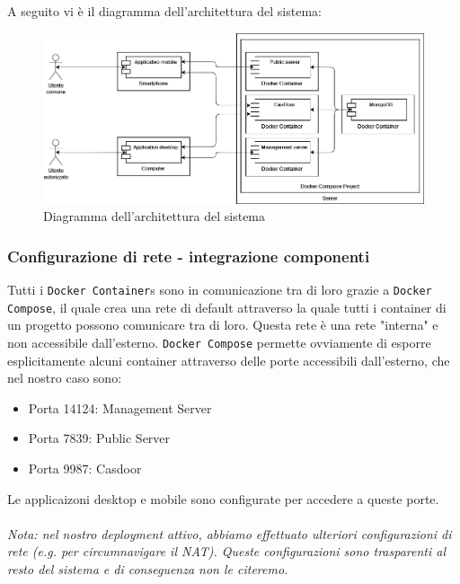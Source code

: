 \documentclass{article}
\begin{document}
A seguito vi è il diagramma dell'architettura del sistema:

\begin{figure}[H]
    \centering
    \includegraphics[width=1\textwidth]{Images/Component.png}
    \caption{Diagramma dell'architettura del sistema}
    \label{fig:architettura}
\end{figure}

\subsubsection{Configurazione di rete - integrazione componenti}
Tutti i \texttt{Docker Container}s sono in comunicazione tra di loro grazie a  \texttt{Docker Compose}, il quale crea una rete di default attraverso la quale tutti i container di un progetto possono comunicare tra di loro.
Questa rete è una rete "interna" e non accessibile dall'esterno. \texttt{Docker Compose} permette ovviamente di esporre esplicitamente alcuni container attraverso delle porte accessibili dall'esterno, che nel nostro caso sono:
\begin{itemize}
	\item Porta 14124: Management Server
	\item Porta 7839: Public Server
	\item Porta 9987: Casdoor
\end{itemize}
Le applicaizoni desktop e mobile sono configurate per accedere a queste porte. 
\\\\
\noindent
\textit{Nota: nel nostro deployment attivo, abbiamo effettuato ulteriori configurazioni di rete (e.g. per circumnavigare il NAT). Queste configurazioni sono trasparenti al resto del sistema e di conseguenza non le citeremo.}
\end{document}
